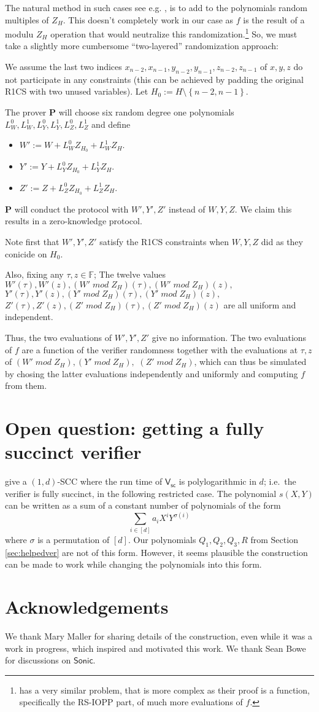 \documentclass[11pt]{article}
\numberwithin{figure}{section} %
\newcommand{\set}[1]{\ensuremath{\left\{#1\right\}}\xspace}
\newcommand{\F}{\ensuremath{\mathbb F}\xspace}
\newcommand{\defeq}{:=}
\newcommand{\prv}{\ensuremath{\mathsf{\mathbf{P}}}\xspace}
\newcommand{\sonic}{\ensuremath{\mathsf{Sonic}}\xspace}
\newcommand{\sigver}{\ensuremath{\mathsf{V_{sc}}}\xspace}
\begin{document}
The natural method in such cases see e.g. \cite{GGPR,BCGV,aurora},
is to add to the polynomials random multiples of $Z_H$. This doesn't completely work in our case as $f$ is the result of a modulu $Z_H$ operation that would neutralize this randomization.\footnote{\cite{aurora} has a very similar problem, that is more complex as their proof is a function, specifically the RS-IOPP part, of much more evaluations of $f$.}
So, we must take a slightly more cumbersome ``two-layered'' randomization approach:

We assume the last two indices $x_{n-2},x_{n-1}, y_{n-2},y_{n-1},z_{n-2},z_{n-1}$
of $x,y,z$ do not participate in any constraints (this can be achieved by padding the original R1CS with two unused variables).
Let $H_0\defeq H\setminus\set{n-2,n-1}$.

The prover \prv will choose six random degree one polynomials 
$L^0_W,L^1_W, L^0_Y,L^1_Y,L^0_Z,L^1_Z$
and define 
\begin{itemize}
 \item $W'\defeq W+L^0_W Z_{H_0}+L^1_W Z_H$.
 \item $Y'\defeq Y+L^0_Y Z_{H_0}+L^1_Y Z_H$.
 \item $Z'\defeq Z+L^0_Z Z_{H_0}+L^1_Z Z_H$.
\end{itemize}
\prv will conduct the protocol with $W',Y',Z'$ instead of $W,Y,Z$.
We claim this results in a zero-knowledge protocol.


Note first that $W',Y',Z'$ satisfy the R1CS constraints when $W,Y,Z$ did
as they conicide on $H_0$.

Also, fixing any $\tau,z\in \F$;
The twelve values $W'(\tau),W'(z),(W' \;mod\; Z_H)(\tau), (W' \;mod\; Z_H)(z),$ $Y'(\tau),Y'(z),(Y' \;mod\; Z_H)(\tau), (Y' \;mod \;Z_H)(z),$ $Z'(\tau),Z'(z),(Z' \;mod\; Z_H)(\tau), (Z' \;mod\; Z_H)(z)$
are all uniform and independent.

Thus, the two evaluations of $W',Y',Z'$ give no information.
The two evaluations of $f$ are a function of the verifier randomness together with the evaluations at $\tau,z$ of $(W' \;mod\; Z_H),(Y' \;mod\; Z_H),$ $(Z' \;mod\; Z_H)$,
which can thus be simulated by chosing the latter evaluations independently and uniformly and computing $f$ from them.

\section{Open question: getting a fully succinct verifier}\label{sec:succinctver}
\cite{sonic} give a $(1,d)$-SCC where the run time of \sigver is polylogarithmic in $d$; i.e.\ the verifier is fully succinct, in the following restricted case.
The polynomial $s(X,Y)$ can be written as a sum of a constant number of polynomials of the form
\[\sum_{i\in [d]} a_iX^i Y^{\sigma(i)}\]
where $\sigma$ is a permutation of $[d]$.
Our polynomials $Q_1,Q_2,Q_3,R$ from Section \ref{sec:helpedver} are not of this form.
However, it seems plausible the construction can be made to work while changing the polynomials into this form.


 \section*{Acknowledgements}
We thank Mary Maller for sharing details of the \cite{sonic} construction, even while it was a work in progress, which inspired and motivated this work. We thank Sean Bowe for discussions on \sonic.

 

\end{document}
